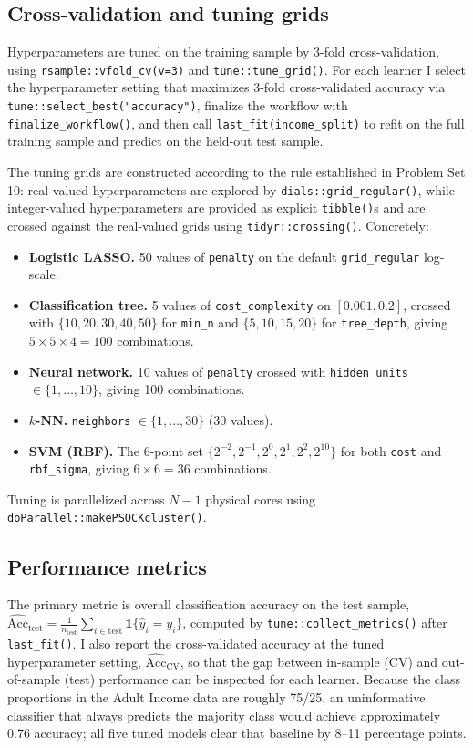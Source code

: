 \documentclass[12pt,english]{article}
\begin{document}
\subsection{Cross-validation and tuning grids}

Hyperparameters are tuned on the training sample by 3-fold cross-validation,
using \texttt{rsample::vfold\_cv(v=3)} and \texttt{tune::tune\_grid()}.
For each learner I select the hyperparameter setting that maximizes
3-fold cross-validated accuracy via \texttt{tune::select\_best("accuracy")},
finalize the workflow with \texttt{finalize\_workflow()}, and then call
\texttt{last\_fit(income\_split)} to refit on the full training sample
and predict on the held-out test sample.

The tuning grids are constructed according to the rule established in
Problem Set 10: real-valued hyperparameters are explored by
\texttt{dials::grid\_regular()}, while integer-valued hyperparameters are
provided as explicit \texttt{tibble()}s and are crossed against the
real-valued grids using \texttt{tidyr::crossing()}. Concretely:
\begin{itemize}
\item \textbf{Logistic LASSO.} 50 values of \texttt{penalty} on the default
\texttt{grid\_regular} log-scale.
\item \textbf{Classification tree.} 5 values of \texttt{cost\_complexity}
on $[0.001, 0.2]$, crossed with $\{10,20,30,40,50\}$ for \texttt{min\_n} and
$\{5,10,15,20\}$ for \texttt{tree\_depth}, giving $5\times 5\times 4 = 100$
combinations.
\item \textbf{Neural network.} 10 values of \texttt{penalty} crossed with
\texttt{hidden\_units} $\in \{1,\ldots,10\}$, giving 100 combinations.
\item \textbf{$k$-NN.} \texttt{neighbors} $\in \{1,\ldots,30\}$ (30 values).
\item \textbf{SVM (RBF).} The 6-point set
$\{2^{-2},2^{-1},2^{0},2^{1},2^{2},2^{10}\}$ for both \texttt{cost} and
\texttt{rbf\_sigma}, giving $6\times 6 = 36$ combinations.
\end{itemize}
Tuning is parallelized across $N-1$ physical cores using
\texttt{doParallel::makePSOCKcluster()}.

\subsection{Performance metrics}

The primary metric is overall classification accuracy on the test sample,
$\widehat{\mathrm{Acc}}_{\text{test}} = \tfrac{1}{n_{\text{test}}}
\sum_{i \in \mathrm{test}} \mathbf{1}\{\hat{y}_i = y_i\}$, computed by
\texttt{tune::collect\_metrics()} after \texttt{last\_fit()}. I also report
the cross-validated accuracy at the tuned hyperparameter setting,
$\widehat{\mathrm{Acc}}_{\text{CV}}$, so that the gap between in-sample
(CV) and out-of-sample (test) performance can be inspected for each
learner. Because the class proportions in the Adult Income data are
roughly 75/25, an uninformative classifier that always predicts the
majority class would achieve approximately 0.76 accuracy; all five tuned
models clear that baseline by 8--11 percentage points.
\end{document}
